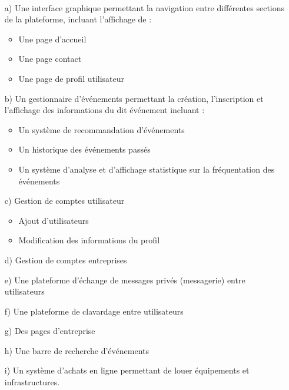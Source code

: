 \documentclass[letter,12pt]{exam}
\begin{document}
\vspace{0.5cm}
\\

\begin{itemize}
\tightlist
\item[a)]
  Une interface graphique permettant la navigation entre différentes
  sections de la plateforme, incluant l'affichage de :

  \begin{itemize}
  \tightlist
  \item
    Une page d'accueil
  \item
    Une page contact
  \item
    Une page de profil utilisateur
  \end{itemize}
\item[b)]
  Un gestionnaire d'événements permettant la création, l'inscription et
  l'affichage des informations du dit événement incluant :

  \begin{itemize}
  \tightlist
  \item
    Un système de recommandation d'événements
  \item
    Un historique des événements passés
  \item
    Un système d'analyse et d'affichage statistique sur la fréquentation
    des événements
  \end{itemize}
\item[c)]
  Gestion de comptes utilisateur

  \begin{itemize}
  \tightlist
  \item
    Ajout d'utilisateurs
  \item
    Modification des informations du profil
  \end{itemize}
\item[d)]
  Gestion de comptes entreprises
\item[e)]
  Une plateforme d'échange de messages privés (messagerie) entre
  utilisateurs
\item[f)]
  Une plateforme de clavardage entre utilisateurs
\item[g)]
  Des pages d'entreprise
\item[h)]
  Une barre de recherche d'événements
\item[i)]
  Un système d'achats en ligne permettant de louer équipements et
  infrastructures.
\end{itemize}
\end{document}
